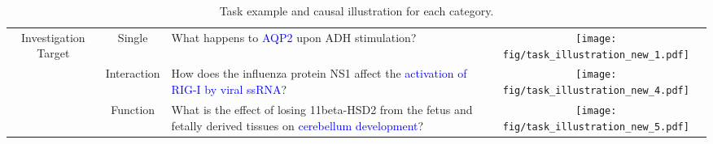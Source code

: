 \begin{table*}[!t]
{\begin{tabular}{ccm{5cm}c}
\midrule
\multirow{7}{*}{Investigation Target}               & Single       & What happens to \textcolor{blue}{AQP2} upon ADH stimulation? & \begin{minipage}{0.2\textwidth}
                   \texttt{[image: fig/task\_illustration\_new\_1.pdf]} %
                \end{minipage}                                                                    \\
                                      & Interaction & How does the influenza protein NS1 affect the \textcolor{blue}{activation of RIG-I by viral ssRNA}? & \begin{minipage}{0.2\textwidth}
                   \texttt{[image: fig/task\_illustration\_new\_4.pdf]} %
                \end{minipage}                             \\
                                      & Function    & What is the effect of losing 11beta-HSD2 from the fetus and fetally derived tissues on \textcolor{blue}{cerebellum development}? & \begin{minipage}{0.2\textwidth}
                   \texttt{[image: fig/task\_illustration\_new\_5.pdf]} %
                \end{minipage} \\

\bottomrule
\end{tabular}}
\caption{Task example and causal illustration for each category.}
\label{table category example}
\vspace{-2mm}
\end{table*}




